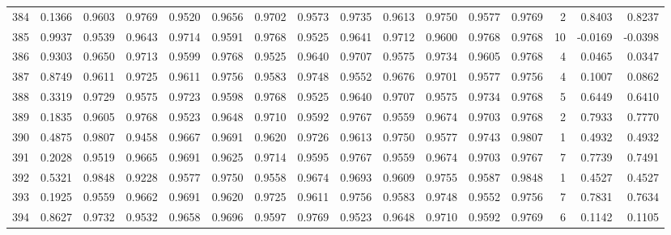 \begin{tabular}{lrrrrrrrrrrrrrrr}
384 &      0.1366 &  0.9603 &  0.9769 &  0.9520 &  0.9656 &  0.9702 &  0.9573 &  0.9735 &  0.9613 &  0.9750 &   0.9577 &     0.9769 &      2 &                    0.8403 &                     0.8237 \\
385 &      0.9937 &  0.9539 &  0.9643 &  0.9714 &  0.9591 &  0.9768 &  0.9525 &  0.9641 &  0.9712 &  0.9600 &   0.9768 &     0.9768 &     10 &                   -0.0169 &                    -0.0398 \\
386 &      0.9303 &  0.9650 &  0.9713 &  0.9599 &  0.9768 &  0.9525 &  0.9640 &  0.9707 &  0.9575 &  0.9734 &   0.9605 &     0.9768 &      4 &                    0.0465 &                     0.0347 \\
387 &      0.8749 &  0.9611 &  0.9725 &  0.9611 &  0.9756 &  0.9583 &  0.9748 &  0.9552 &  0.9676 &  0.9701 &   0.9577 &     0.9756 &      4 &                    0.1007 &                     0.0862 \\
388 &      0.3319 &  0.9729 &  0.9575 &  0.9723 &  0.9598 &  0.9768 &  0.9525 &  0.9640 &  0.9707 &  0.9575 &   0.9734 &     0.9768 &      5 &                    0.6449 &                     0.6410 \\
389 &      0.1835 &  0.9605 &  0.9768 &  0.9523 &  0.9648 &  0.9710 &  0.9592 &  0.9767 &  0.9559 &  0.9674 &   0.9703 &     0.9768 &      2 &                    0.7933 &                     0.7770 \\
390 &      0.4875 &  0.9807 &  0.9458 &  0.9667 &  0.9691 &  0.9620 &  0.9726 &  0.9613 &  0.9750 &  0.9577 &   0.9743 &     0.9807 &      1 &                    0.4932 &                     0.4932 \\
391 &      0.2028 &  0.9519 &  0.9665 &  0.9691 &  0.9625 &  0.9714 &  0.9595 &  0.9767 &  0.9559 &  0.9674 &   0.9703 &     0.9767 &      7 &                    0.7739 &                     0.7491 \\
392 &      0.5321 &  0.9848 &  0.9228 &  0.9577 &  0.9750 &  0.9558 &  0.9674 &  0.9693 &  0.9609 &  0.9755 &   0.9587 &     0.9848 &      1 &                    0.4527 &                     0.4527 \\
393 &      0.1925 &  0.9559 &  0.9662 &  0.9691 &  0.9620 &  0.9725 &  0.9611 &  0.9756 &  0.9583 &  0.9748 &   0.9552 &     0.9756 &      7 &                    0.7831 &                     0.7634 \\
394 &      0.8627 &  0.9732 &  0.9532 &  0.9658 &  0.9696 &  0.9597 &  0.9769 &  0.9523 &  0.9648 &  0.9710 &   0.9592 &     0.9769 &      6 &                    0.1142 &                     0.1105 \\

\end{tabular}
